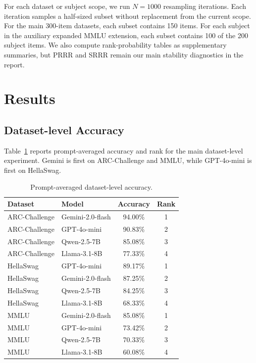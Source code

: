 \documentclass[11pt]{article}
\begin{document}
For each dataset or subject scope, we run $N=1000$ resampling iterations. Each iteration samples a half-sized subset without replacement from the current scope. For the main 300-item datasets, each subset contains 150 items. For each subject in the auxiliary expanded MMLU extension, each subset contains 100 of the 200 subject items. We also compute rank-probability tables as supplementary summaries, but PRRR and SRRR remain our main stability diagnostics in the report.

\section{Results}

\subsection{Dataset-level Accuracy}

Table~\ref{tab:acc} reports prompt-averaged accuracy and rank for the main dataset-level experiment. Gemini is first on ARC-Challenge and MMLU, while GPT-4o-mini is first on HellaSwag.

\begin{table}[H]
\centering
\caption{Prompt-averaged dataset-level accuracy.}
\label{tab:acc}
\begin{tabular}{@{}llcc@{}}
\toprule
\textbf{Dataset} & \textbf{Model} & \textbf{Accuracy} & \textbf{Rank} \\
\midrule
ARC-Challenge & Gemini-2.0-flash & 94.00\% & 1 \\
ARC-Challenge & GPT-4o-mini & 90.83\% & 2 \\
ARC-Challenge & Qwen-2.5-7B & 85.08\% & 3 \\
ARC-Challenge & Llama-3.1-8B & 77.33\% & 4 \\
\midrule
HellaSwag & GPT-4o-mini & 89.17\% & 1 \\
HellaSwag & Gemini-2.0-flash & 87.25\% & 2 \\
HellaSwag & Qwen-2.5-7B & 84.25\% & 3 \\
HellaSwag & Llama-3.1-8B & 68.33\% & 4 \\
\midrule
MMLU & Gemini-2.0-flash & 85.08\% & 1 \\
MMLU & GPT-4o-mini & 73.42\% & 2 \\
MMLU & Qwen-2.5-7B & 70.33\% & 3 \\
MMLU & Llama-3.1-8B & 60.08\% & 4 \\
\bottomrule
\end{tabular}
\end{table}
\end{document}
